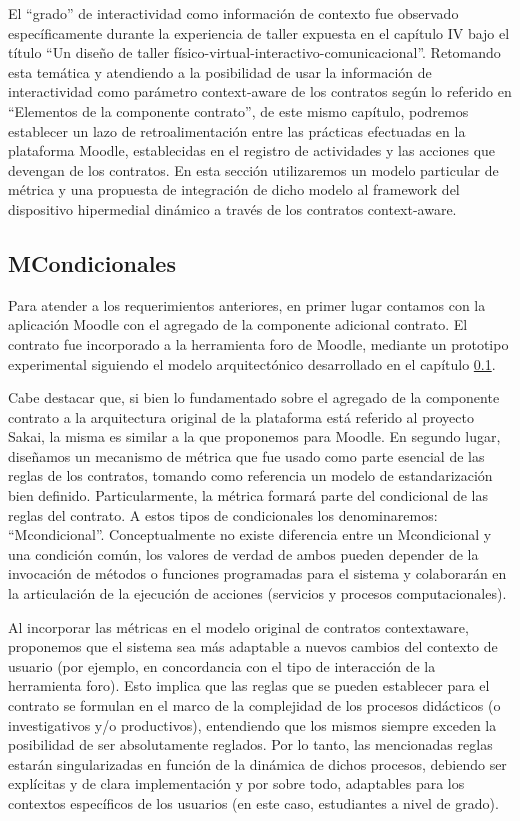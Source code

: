 El “grado” de interactividad como información de contexto fue observado
específicamente durante la experiencia de taller expuesta en el capítulo IV
bajo el título “Un diseño de taller físico-virtual-interactivo-comunicacional”.
Retomando esta temática y atendiendo a la posibilidad de usar la información
de interactividad como parámetro context-aware de los contratos según lo referido
en “Elementos de la componente contrato”, de este mismo capítulo,
podremos establecer un lazo de retroalimentación entre las prácticas efectuadas
en la plataforma Moodle, establecidas en el registro de actividades y las
acciones que devengan de los contratos.
En esta sección utilizaremos un modelo particular de métrica y una propuesta
de integración de dicho modelo al framework del dispositivo hipermedial
dinámico a través de los contratos context-aware.



\subsection{MCondicionales}

Para atender a los requerimientos anteriores, en primer lugar contamos con la
aplicación Moodle con el agregado de la componente adicional contrato. El
contrato fue incorporado a la herramienta foro de Moodle, mediante un prototipo
experimental siguiendo el modelo arquitectónico desarrollado en el
capítulo \ref{}.

Cabe destacar que, si bien lo fundamentado sobre el agregado de la componente
contrato a la arquitectura original de la plataforma está referido al
proyecto Sakai, la misma es similar a la que proponemos para Moodle. En
segundo lugar, diseñamos un mecanismo de métrica que fue usado como parte
esencial de las reglas de los contratos, tomando como referencia un modelo de
estandarización bien definido. Particularmente, la métrica formará parte del
condicional de las reglas del contrato. A estos tipos de condicionales los denominaremos:
“Mcondicional”. Conceptualmente no existe diferencia entre un Mcondicional y una
condición común, los valores de verdad de ambos pueden depender de la invocación
de métodos o funciones programadas para el sistema y colaborarán en la
articulación de la ejecución de acciones (servicios y procesos computacionales).

Al incorporar las métricas en el modelo original de contratos contextaware,
proponemos que el sistema sea más adaptable a nuevos cambios del contexto de
usuario (por ejemplo, en concordancia con el tipo de interacción de la
herramienta foro). Esto implica que las reglas que se pueden establecer
para el contrato se formulan en el marco de la complejidad de los procesos
didácticos (o investigativos y/o productivos), entendiendo que los mismos
siempre exceden la posibilidad de ser absolutamente reglados. Por lo tanto, las
mencionadas reglas estarán singularizadas en función de la dinámica de dichos
procesos, debiendo ser explícitas y de clara implementación y por sobre todo,
adaptables para los contextos específicos de los usuarios (en este caso, estudiantes
a nivel de grado).

